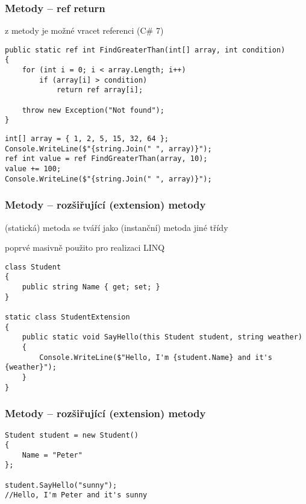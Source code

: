 \begin{frame}[fragile]
\frametitle{Metody -- ref return}
\vskip -2mm
\begin{bitemize}{}
\item z metody je možné vracet referenci (C\# 7)
\end{bitemize}
\vskip -2mm
\begin{yesblock}
\begin{lstlisting}[basicstyle=\small]
public static ref int FindGreaterThan(int[] array, int condition)
{
    for (int i = 0; i < array.Length; i++)
        if (array[i] > condition)
            return ref array[i];

    throw new Exception("Not found");
}
\end{lstlisting}
\end{yesblock}
\vskip -2mm
\begin{yesblock}
\begin{lstlisting}[basicstyle=\small]
int[] array = { 1, 2, 5, 15, 32, 64 };
Console.WriteLine($"{string.Join(" ", array)}");
ref int value = ref FindGreaterThan(array, 10);
value += 100;
Console.WriteLine($"{string.Join(" ", array)}");
\end{lstlisting}
\end{yesblock}
\end{frame}





\begin{frame}[fragile]
\frametitle{Metody -- rozšiřující (extension) metody}
\vskip -2mm
\begin{bitemize}{}
\item (statická) metoda se tváří jako (instanční) metoda jiné třídy
\item poprvé masivně použito pro realizaci LINQ
\end{bitemize}
\vskip -2mm
\begin{yesblock}
\begin{lstlisting}[basicstyle=\small]
class Student
{
    public string Name { get; set; }
}

static class StudentExtension
{
    public static void SayHello(this Student student, string weather)
    {
        Console.WriteLine($"Hello, I'm {student.Name} and it's {weather}");
    }
}
\end{lstlisting}
\end{yesblock}
\end{frame}

\begin{frame}[fragile]
\frametitle{Metody -- rozšiřující (extension) metody}
\begin{yesblock}
\begin{lstlisting}[basicstyle=\small]
Student student = new Student()
{
    Name = "Peter"
};

student.SayHello("sunny");
//Hello, I'm Peter and it's sunny
\end{lstlisting}
\end{yesblock}
\end{frame}


\zkouskove